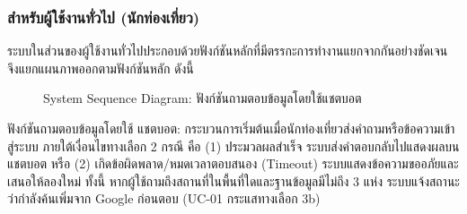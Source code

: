 \subsubsection{สำหรับผู้ใช้งานทั่วไป (นักท่องเที่ยว)}

ระบบในส่วนของผู้ใช้งานทั่วไปประกอบด้วยฟังก์ชันหลักที่มีตรรกะการทำงานแยกจากกันอย่างชัดเจน จึงแยกแผนภาพออกตามฟังก์ชันหลัก ดังนี้

\begin{figure}[H]
\centering
{}
\caption{System Sequence Diagram: ฟังก์ชันถามตอบข้อมูลโดยใช้แชตบอต}
\label{fig:ssd_tourist_chatbot}
\end{figure}

ฟังก์ชันถามตอบข้อมูลโดยใช้ แชตบอต: กระบวนการเริ่มต้นเมื่อนักท่องเที่ยวส่งคำถามหรือข้อความเข้าสู่ระบบ ภายใต้เงื่อนไขทางเลือก 2 กรณี คือ (1) ประมวลผลสำเร็จ ระบบส่งคำตอบกลับไปแสดงผลบนแชตบอต หรือ (2) เกิดข้อผิดพลาด/หมดเวลาตอบสนอง (Timeout) ระบบแสดงข้อความขออภัยและเสนอให้ลองใหม่ ทั้งนี้ หากผู้ใช้ถามถึงสถานที่ในพื้นที่ใดและฐานข้อมูลมีไม่ถึง 3 แห่ง ระบบแจ้งสถานะว่ากำลังค้นเพิ่มจาก Google ก่อนตอบ (UC-01 กระแสทางเลือก 3b)


